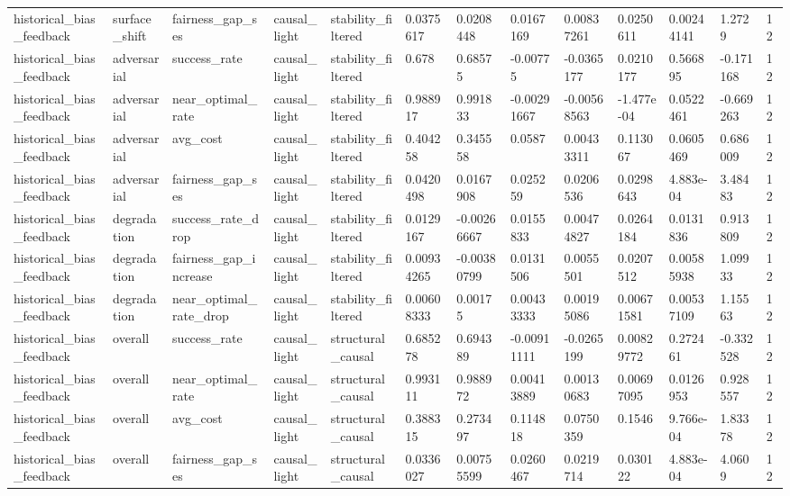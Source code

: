 \begin{tabular}{lllllllllllll}
historical\_bias\_feedback & surface\_shift & fairness\_gap\_ses & causal\_light & stability\_filtered & 0.0375617 & 0.0208448 & 0.0167169 & 0.00837261 & 0.0250611 & 0.00244141 & 1.2729 & 12 \\
historical\_bias\_feedback & adversarial & success\_rate & causal\_light & stability\_filtered & 0.678 & 0.68575 & -0.00775 & -0.0365177 & 0.0210177 & 0.566895 & -0.171168 & 12 \\
historical\_bias\_feedback & adversarial & near\_optimal\_rate & causal\_light & stability\_filtered & 0.988917 & 0.991833 & -0.00291667 & -0.00568563 & -1.477e-04 & 0.0522461 & -0.669263 & 12 \\
historical\_bias\_feedback & adversarial & avg\_cost & causal\_light & stability\_filtered & 0.404258 & 0.345558 & 0.0587 & 0.00433311 & 0.113067 & 0.0605469 & 0.686009 & 12 \\
historical\_bias\_feedback & adversarial & fairness\_gap\_ses & causal\_light & stability\_filtered & 0.0420498 & 0.0167908 & 0.025259 & 0.0206536 & 0.0298643 & 4.883e-04 & 3.48483 & 12 \\
historical\_bias\_feedback & degradation & success\_rate\_drop & causal\_light & stability\_filtered & 0.0129167 & -0.00266667 & 0.0155833 & 0.00474827 & 0.0264184 & 0.0131836 & 0.913809 & 12 \\
historical\_bias\_feedback & degradation & fairness\_gap\_increase & causal\_light & stability\_filtered & 0.00934265 & -0.00380799 & 0.0131506 & 0.0055501 & 0.0207512 & 0.00585938 & 1.09933 & 12 \\
historical\_bias\_feedback & degradation & near\_optimal\_rate\_drop & causal\_light & stability\_filtered & 0.00608333 & 0.00175 & 0.00433333 & 0.00195086 & 0.00671581 & 0.00537109 & 1.15563 & 12 \\
historical\_bias\_feedback & overall & success\_rate & causal\_light & structural\_causal & 0.685278 & 0.694389 & -0.00911111 & -0.0265199 & 0.00829772 & 0.272461 & -0.332528 & 12 \\
historical\_bias\_feedback & overall & near\_optimal\_rate & causal\_light & structural\_causal & 0.993111 & 0.988972 & 0.00413889 & 0.00130683 & 0.00697095 & 0.0126953 & 0.928557 & 12 \\
historical\_bias\_feedback & overall & avg\_cost & causal\_light & structural\_causal & 0.388315 & 0.273497 & 0.114818 & 0.0750359 & 0.1546 & 9.766e-04 & 1.83378 & 12 \\
historical\_bias\_feedback & overall & fairness\_gap\_ses & causal\_light & structural\_causal & 0.0336027 & 0.00755599 & 0.0260467 & 0.0219714 & 0.030122 & 4.883e-04 & 4.0609 & 12 \\

\end{tabular}
